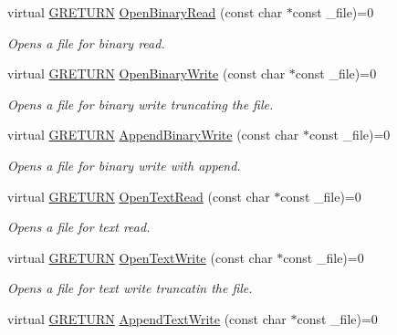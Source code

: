 \begin{DoxyCompactItemize}
\item 
virtual \hyperlink{namespace_g_w_a69b1aaebac1cac8049825f035884c95b}{G\+R\+E\+T\+U\+RN} \hyperlink{class_g_w_1_1_c_o_r_e_1_1_g_file_aba62e5beb5ee71ed2ba8ef57a352fbdf}{Open\+Binary\+Read} (const char $\ast$const \+\_\+file)=0
\begin{DoxyCompactList}\small\item\em Opens a file for binary read. \end{DoxyCompactList}\item 
virtual \hyperlink{namespace_g_w_a69b1aaebac1cac8049825f035884c95b}{G\+R\+E\+T\+U\+RN} \hyperlink{class_g_w_1_1_c_o_r_e_1_1_g_file_ad48acf22adf7a1a7d8e0d46c62bd0987}{Open\+Binary\+Write} (const char $\ast$const \+\_\+file)=0
\begin{DoxyCompactList}\small\item\em Opens a file for binary write truncating the file. \end{DoxyCompactList}\item 
virtual \hyperlink{namespace_g_w_a69b1aaebac1cac8049825f035884c95b}{G\+R\+E\+T\+U\+RN} \hyperlink{class_g_w_1_1_c_o_r_e_1_1_g_file_a7a940ea0cb44b5986a7e0465f8b02c8d}{Append\+Binary\+Write} (const char $\ast$const \+\_\+file)=0
\begin{DoxyCompactList}\small\item\em Opens a file for binary write with append. \end{DoxyCompactList}\item 
virtual \hyperlink{namespace_g_w_a69b1aaebac1cac8049825f035884c95b}{G\+R\+E\+T\+U\+RN} \hyperlink{class_g_w_1_1_c_o_r_e_1_1_g_file_aed849d7156783e8fc3242bb052b5169b}{Open\+Text\+Read} (const char $\ast$const \+\_\+file)=0
\begin{DoxyCompactList}\small\item\em Opens a file for text read. \end{DoxyCompactList}\item 
virtual \hyperlink{namespace_g_w_a69b1aaebac1cac8049825f035884c95b}{G\+R\+E\+T\+U\+RN} \hyperlink{class_g_w_1_1_c_o_r_e_1_1_g_file_a1d0b2484f8cace8db7d0f50d4f9b7301}{Open\+Text\+Write} (const char $\ast$const \+\_\+file)=0
\begin{DoxyCompactList}\small\item\em Opens a file for text write truncatin the file. \end{DoxyCompactList}\item 
virtual \hyperlink{namespace_g_w_a69b1aaebac1cac8049825f035884c95b}{G\+R\+E\+T\+U\+RN} \hyperlink{class_g_w_1_1_c_o_r_e_1_1_g_file_a4abe346d844c2473dc799de5a611cb5d}{Append\+Text\+Write} (const char $\ast$const \+\_\+file)=0

\end{DoxyCompactItemize}
